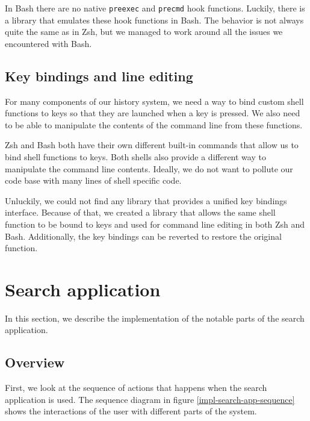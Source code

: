 In Bash there are no native \verb|preexec| and \verb|precmd| hook functions. Luckily, there is a library \cite{lib-bash-preexec} that emulates these hook functions in Bash. The behavior is not always quite the same as in Zsh, but we managed to work around all the issues we encountered with Bash. 

\subsection{Key bindings and line editing}

For many components of our history system, we need a way to bind custom shell functions to keys so that they are launched when a key is pressed. We also need to be able to manipulate the contents of the command line from these functions.

Zsh and Bash both have their own different built-in commands that allow us to bind shell functions to keys. Both shells also provide a different way to manipulate the command line contents. Ideally, we do not want to pollute our code base with many lines of shell specific code.

Unluckily, we could not find any library that provides a unified key bindings interface. Because of that, we created a library\cite{lib-bash-zsh-compat-widgets} that allows the same shell function to be bound to keys and used for command line editing in both Zsh and Bash. Additionally, the key bindings can be reverted to restore the original function.



\section{Search application}

In this section, we describe the implementation of the notable parts of the search application. 

\subsection{Overview}

First, we look at the sequence of actions that happens when the search application is used. The sequence diagram in figure \ref{impl-search-app-sequence} shows the interactions of the user with different parts of the system.

